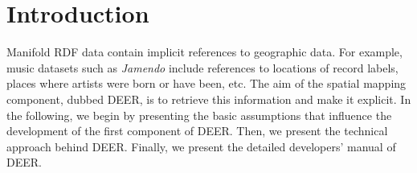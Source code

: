 \documentclass[a4paper,twoside,bibtotoc,abstracton,12pt,BCOR=15mm]{article}
\newcommand{\geolift}{\textsc{DEER}\xspace}
\begin{document}
\newpage
\tableofcontents
\newpage

\section{Introduction}
Manifold RDF data contain implicit references to geographic data.
For example, music datasets such as \emph{Jamendo} include references to locations of record labels, places where artists were born or have been, etc.
The aim of the spatial mapping component, dubbed \geolift, is to retrieve this information and make it explicit.
In the following, we begin by presenting the basic assumptions that influence the development of the first component of \geolift.
Then, we present the technical approach behind \geolift.
Finally, we present the detailed developers' manual of \geolift.
\end{document}
